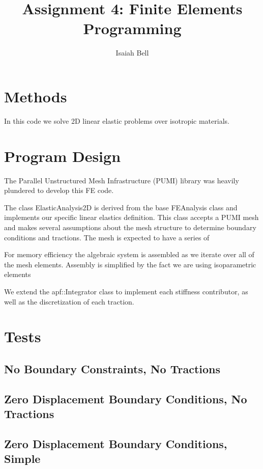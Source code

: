 \documentclass{article}
\begin{document}
\title{Assignment 4: Finite Elements Programming}
\author{Isaiah Bell} 
\maketitle

\section{Methods}

In this code we solve 2D linear elastic problems over isotropic materials.


\section{Program Design}

The Parallel Unstructured Mesh Infrastructure (PUMI) library was heavily plundered to develop this FE code.

The class ElasticAnalysis2D is derived from the base FEAnalysis class and implements
our specific linear elastics definition. This class accepts a PUMI mesh and makes
several assumptions about the mesh structure to determine boundary conditions and
tractions. The mesh is expected to have a series of  

For memory efficiency the algebraic system is assembled as we iterate over all of the
mesh elements. Assembly is simplified by the fact we are using isoparametric elements

We extend the apf::Integrator class to implement each stiffness contributor, as well as the discretization of each traction.


\section{Tests}

\subsection{No Boundary Constraints, No Tractions}


\subsection{Zero Displacement Boundary Conditions, No Tractions}


\subsection{Zero Displacement Boundary Conditions, Simple}
\end{document}
